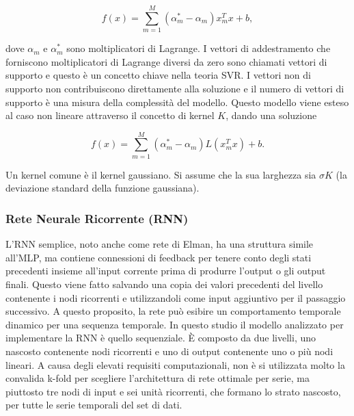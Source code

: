\documentclass[12pt,a4paper]{report}
\begin{document}
\begin{equation}
    {\displaystyle f(x) = \sum\limits_{m=1}^{M}(\alpha^*_m - \alpha_m)x_m^Tx + b},
\end{equation}

dove $\alpha_m$ e $\alpha_m^\ast$ sono moltiplicatori di Lagrange. I vettori di addestramento che forniscono moltiplicatori di Lagrange diversi da zero sono chiamati vettori di supporto e questo è un concetto chiave nella teoria SVR. I vettori non di supporto non contribuiscono direttamente alla soluzione e il numero di vettori di supporto è una misura della complessità del modello. Questo modello viene esteso al caso non lineare attraverso il concetto di kernel $K$, dando una soluzione

\begin{equation}
    {\displaystyle f(x) = \sum\limits_{m=1}^{M}(\alpha^*_m - \alpha_m)L(x_m^Tx) + b}.
\end{equation}

Un kernel comune è il kernel gaussiano. Si assume che la sua larghezza sia $\sigma K$ (la deviazione standard della funzione gaussiana).


\subsubsection{Rete Neurale Ricorrente (RNN)}
L'RNN semplice, noto anche come rete di Elman, ha una struttura simile all'MLP, ma contiene connessioni di feedback per tenere conto degli stati precedenti insieme all'input corrente prima di produrre l'output o gli output finali.
Questo viene fatto salvando una copia dei valori precedenti del livello contenente i nodi ricorrenti e utilizzandoli come input aggiuntivo per il passaggio successivo. A questo proposito, la rete può esibire un comportamento temporale dinamico per una sequenza temporale.
In questo studio il modello analizzato per implementare la RNN è quello sequenziale. È composto da due livelli, uno nascosto contenente nodi ricorrenti e uno di output contenente uno o più nodi lineari. A causa degli elevati requisiti computazionali, non è si utilizzata molto la convalida k-fold per scegliere l'architettura di rete ottimale per serie, ma piuttosto tre nodi di input e sei unità ricorrenti, che formano lo strato nascosto, per tutte le serie temporali del set di dati. 
\end{document}
